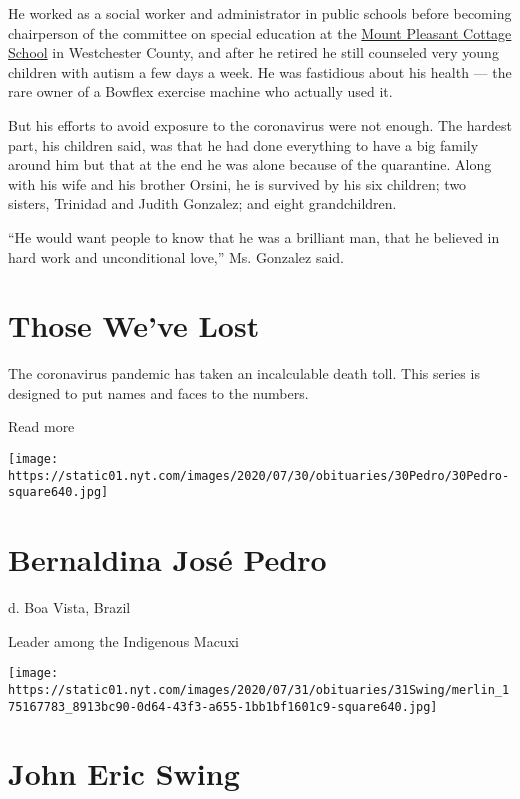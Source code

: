 He worked as a social worker and administrator in public schools before
becoming chairperson of the committee on special education at the
\href{https://www.mpcsny.org/}{Mount Pleasant Cottage School} in
Westchester County, and after he retired he still counseled very young
children with autism a few days a week. He was fastidious about his
health --- the rare owner of a Bowflex exercise machine who actually
used it.

But his efforts to avoid exposure to the coronavirus were not enough.
The hardest part, his children said, was that he had done everything to
have a big family around him but that at the end he was alone because of
the quarantine. Along with his wife and his brother Orsini, he is
survived by his six children; two sisters, Trinidad and Judith Gonzalez;
and eight grandchildren.

``He would want people to know that he was a brilliant man, that he
believed in hard work and unconditional love,'' Ms. Gonzalez said.

\href{https://www.nytimes.com/interactive/2020/obituaries/people-died-coronavirus-obituaries.html?action=click\&pgtype=Article\&state=default\&region=BELOW_MAIN_CONTENT\&context=covid_obits_promo}{}

\hypertarget{those-weve-lost}{%
\section{Those We've Lost}\label{those-weve-lost}}

The coronavirus pandemic has taken an incalculable death toll. This
series is designed to put names and faces to the numbers.

Read more

\texttt{[image: https://static01.nyt.com/images/2020/07/30/obituaries/30Pedro/30Pedro-square640.jpg]}

\hypertarget{bernaldina-josuxe9-pedro}{%
\section{Bernaldina José Pedro}\label{bernaldina-josuxe9-pedro}}

d. Boa Vista, Brazil

Leader among the Indigenous Macuxi

\texttt{[image: https://static01.nyt.com/images/2020/07/31/obituaries/31Swing/merlin\_175167783\_8913bc90-0d64-43f3-a655-1bb1bf1601c9-square640.jpg]}

\hypertarget{john-eric-swing}{%
\section{John Eric Swing}\label{john-eric-swing}}


